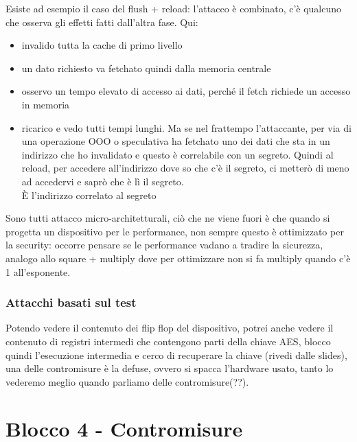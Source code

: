 \documentclass[oneside, 12pt]{extbook}
\begin{document}
Esiste ad esempio il caso del flush + reload: l'attacco è combinato, c'è qualcuno che osserva gli effetti fatti dall'altra fase. Qui:
\begin{itemize}
	\item invalido tutta la cache di primo livello
	\item un dato richiesto va fetchato quindi dalla memoria centrale
	\item osservo un tempo elevato di accesso ai dati, perché il fetch richiede un accesso in memoria
	\item ricarico e vedo tutti tempi lunghi. Ma se nel frattempo l'attaccante, per via di una operazione OOO o speculativa ha fetchato uno dei dati che sta in un indirizzo che ho invalidato e questo è correlabile con un segreto. Quindi al reload, per accedere all'indirizzo dove so che c'è il segreto, ci metterò di meno ad accedervi e saprò che è lì il segreto.\\È l'indirizzo correlato al segreto
\end{itemize}
Sono tutti attacco micro-architetturali, ciò che ne viene fuori è che quando si progetta un dispositivo per le performance, non sempre questo è ottimizzato per la security: occorre pensare se le performance vadano a tradire la sicurezza, analogo allo square + multiply dove per ottimizzare non si fa multiply quando c'è 1 all'esponente.
\subsection{Attacchi basati sul test}
Potendo vedere il contenuto dei flip flop del dispositivo, potrei anche vedere il contenuto di registri intermedi che contengono parti della chiave AES, blocco quindi l'esecuzione intermedia e cerco di recuperare la chiave (rivedi dalle slides), una delle contromisure è la defuse, ovvero si spacca l'hardware usato, tanto lo vederemo meglio quando parliamo delle contromisure(??).

\chapter{Blocco 4 - Contromisure}
\end{document}
